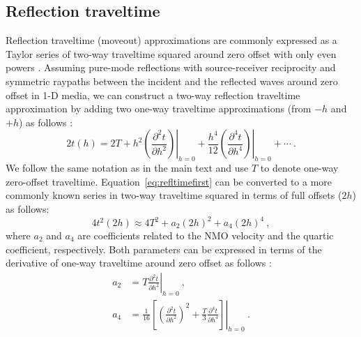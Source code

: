 \subsection{Reflection traveltime}
Reflection traveltime (moveout) approximations are commonly expressed as a Taylor series of two-way traveltime squared around zero offset with only even powers \cite[]{taner}. Assuming pure-mode reflections with source-receiver reciprocity and symmetric raypaths between the incident and the reflected waves around zero offset in 1-D media, we can construct a two-way reflection traveltime approximation by adding two one-way traveltime approximations (from $-h$ and $+h$) as follows \cite[]{thomsenbook,tsvankinbook,zoneinterval}:
\begin{equation}
\label{eq:refltimefirst}
2 t (h) = 2 T +  h^2 \left.\left(\frac{\partial^2 t}{\partial h^2 }\right)\right\rvert_{h=0} + \frac{h^4}{12} \left.\left(\frac{\partial^4 t}{\partial h^4 }\right)\right\rvert_{h=0} + \cdots  ~.
\end{equation}
We follow the same notation as in the main text and use $T$ to denote one-way zero-offset traveltime. Equation~\ref{eq:refltimefirst} can be converted to a more commonly known series in two-way traveltime squared in terms of full offsets ($2h$) as follows:
\begin{equation}
\label{eq:refltime}
4 t^2 ( 2h ) \approx 4 T^2 +  a_2 (2 h)^2 + a_4 (2 h)^4~,
\end{equation}
where $a_2$ and $a_4$ are coefficients related to the NMO velocity and the quartic coefficient, respectively. Both parameters can be expressed in terms of the derivative of one-way traveltime around zero offset as follows \cite[]{alhti,zoneinterval}:
\begin{align} 
\label{eq:a2}
a_2 & =\left.T \frac{\partial^2 t}{\partial h^2 }\right\rvert_{h=0}~,\\
\label{eq:a4}
a_4 & = \left. \frac{1}{16}\left[ \left(\frac{\partial^2 t}{\partial h^2 }\right)^2 + \frac{T}{3} \frac{\partial^4 t}{\partial h^4 } \right]\right\rvert_{h=0}~.
\end{align}

